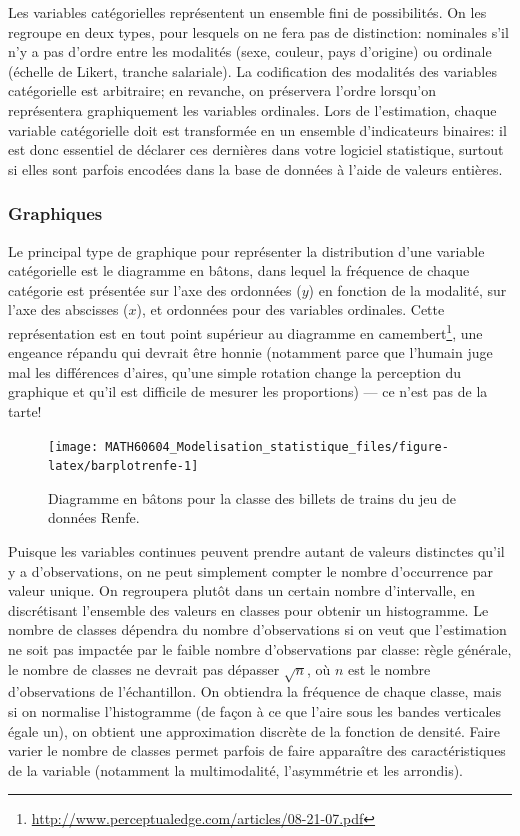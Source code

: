 \documentclass[
  11pt,
  letterpaper,
]{article}
\renewcommand{\href}[2]{#2\footnote{\url{#1}}}
\theoremstyle{definition}
\theoremstyle{definition}
\theoremstyle{definition}
\theoremstyle{definition}
\theoremstyle{remark}
\begin{document}
Les variables catégorielles représentent un ensemble fini de possibilités. On les regroupe en deux types, pour lesquels on ne fera pas de distinction: nominales s'il n'y a pas d'ordre entre les modalités (sexe, couleur, pays d'origine) ou ordinale (échelle de Likert, tranche salariale). La codification des modalités des variables catégorielle est arbitraire; en revanche, on préservera l'ordre lorsqu'on représentera graphiquement les variables ordinales. Lors de l'estimation, chaque variable catégorielle doit est transformée en un ensemble d'indicateurs binaires: il est donc essentiel de déclarer ces dernières dans votre logiciel statistique, surtout si elles sont parfois encodées dans la base de données à l'aide de valeurs entières.

\hypertarget{graphiques}{%
\subsubsection{Graphiques}\label{graphiques}}

Le principal type de graphique pour représenter la distribution d'une variable catégorielle est le diagramme en bâtons, dans lequel la fréquence de chaque catégorie est présentée sur l'axe des ordonnées (\(y\)) en fonction de la modalité, sur l'axe des abscisses (\(x\)), et ordonnées pour des variables ordinales. Cette représentation est en tout point supérieur au \href{http://www.perceptualedge.com/articles/08-21-07.pdf}{diagramme en camembert}, une engeance répandu qui devrait être honnie (notamment parce que l'humain juge mal les différences d'aires, qu'une simple rotation change la perception du graphique et qu'il est difficile de mesurer les proportions) --- ce n'est pas de la tarte!

\begin{figure}

{\centering \texttt{[image: MATH60604\_Modelisation\_statistique\_files/figure-latex/barplotrenfe-1]} 

}

\caption{Diagramme en bâtons pour la classe des billets de trains du jeu de données Renfe.}\label{fig:barplotrenfe}
\end{figure}

Puisque les variables continues peuvent prendre autant de valeurs distinctes qu'il y a d'observations, on ne peut simplement compter le nombre d'occurrence par valeur unique. On regroupera plutôt dans un certain nombre d'intervalle, en discrétisant l'ensemble des valeurs en classes pour obtenir un histogramme. Le nombre de classes dépendra du nombre d'observations si on veut que l'estimation ne soit pas impactée par le faible nombre d'observations par classe: règle générale, le nombre de classes ne devrait pas dépasser \(\sqrt{n}\), où \(n\) est le nombre d'observations de l'échantillon. On obtiendra la fréquence de chaque classe, mais si on normalise l'histogramme (de façon à ce que l'aire sous les bandes verticales égale un), on obtient une approximation discrète de la fonction de densité. Faire varier le nombre de classes permet parfois de faire apparaître des caractéristiques de la variable (notamment la multimodalité, l'asymmétrie et les arrondis).
\end{document}
